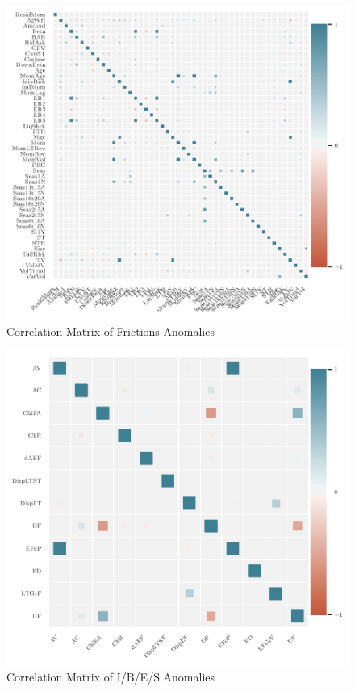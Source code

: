 \begin{center}
	\begin{figure}
		\includegraphics[width=\textwidth,height=\textheight,keepaspectratio]{Figures/corrplot_frictions.pdf}
		\caption{Correlation Matrix of Frictions Anomalies}
		\label{fig:corrplot_frictions}
	\end{figure}
\end{center}


\begin{center}
	\begin{figure}
		\includegraphics{Figures/corrplot_ibes.pdf}
		\caption{Correlation Matrix of I/B/E/S Anomalies}
		\label{fig:corrplot_ibes}
	\end{figure}
\end{center}
	

